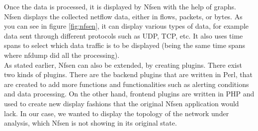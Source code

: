Once the data is processed, it is displayed by Nfsen with the help of graphs. Nfsen displays the collected netflow data, either in flows, packets, or bytes. As you can see in figure \ref{fig:nfsen}, it can display various types of data, for example data sent through different protocols such as UDP, TCP, etc. It also uses time spans to select which data traffic is to be displayed (being the same time spans where nfdump did all the processing).\\

As stated earlier, Nfsen can also be extended, by creating plugins. There exist two kinds of plugins. There are the backend plugins that are written in Perl, that are created to add more functions and functionalities such as alerting conditions and data processing. On the other hand, frontend plugins are written in PHP and used to create new display fashions that the original Nfsen application would lack. In our case, we wanted to display the topology of the network under analysis, which Nfsen is not showing in its original state.
